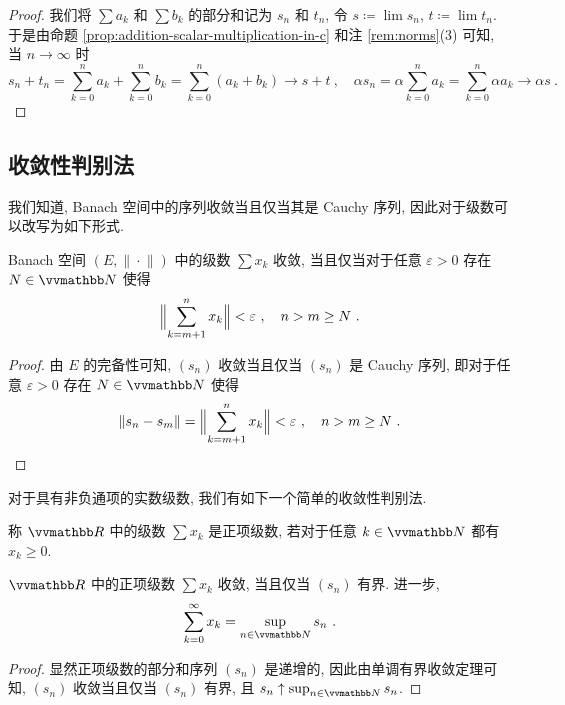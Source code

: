 \begin{proof}
    我们将 \(\sum a_k\) 和 \(\sum b_k\) 的部分和记为 \(s_n\) 和 \(t_n\), 令 \(s \coloneqq \lim s_n\), \(t \coloneqq \lim t_n\). 于是由命题 \ref{prop:addition-scalar-multiplication-in-c} 和注 \ref{rem:norms}(3) 可知, 当 \(n \to \infty\) 时
    \[
        s_n + t_n = \sum_{k = 0}^n a_k + \sum_{k = 0}^n b_k = \sum_{k = 0}^n (a_k + b_k) \to s + t\ ,\quad \alpha s_n = \alpha \sum_{k = 0}^n a_k = \sum_{k = 0}^n \alpha a_k \to \alpha s\ .
    \]
\end{proof}

\subsection{收敛性判别法}

我们知道, Banach 空间中的序列收敛当且仅当其是 Cauchy 序列, 因此对于级数可以改写为如下形式.

\begin{theorem}[Cauchy 准则]
    Banach 空间 \((E, \|\!\cdot\!\|)\) 中的级数 \(\sum x_k\) 收敛, 当且仅当对于任意 \(\varepsilon > 0\) 存在 \(N \in \N\) 使得
    \[
        \Bigl\|\sum_{k = m + 1}^n x_k\Bigr\| < \varepsilon\ ,\quad n > m \geq N\ .
    \]
\end{theorem}

\begin{proof}
    由 \(E\) 的完备性可知, \((s_n)\) 收敛当且仅当 \((s_n)\) 是 Cauchy 序列, 即对于任意 \(\varepsilon > 0\) 存在 \(N \in \N\) 使得
    \[
        \|s_n - s_m\| = \Bigl\|\sum_{k = m + 1}^n x_k\Bigr\| < \varepsilon\ ,\quad n > m \geq N\ .
    \]
\end{proof}

对于具有非负通项的实数级数, 我们有如下一个简单的收敛性判别法.

\begin{definition}[正项级数]
    称 \(\R\) 中的级数 \(\sum x_k\) 是正项级数, 若对于任意 \(k \in \N\) 都有 \(x_k \geq 0\).
\end{definition}

\begin{theorem}\label{thm:nonnegative-series-convergence-criterion}
    \(\R\) 中的正项级数 \(\sum x_k\) 收敛, 当且仅当 \((s_n)\) 有界. 进一步,
    \[
        \sum_{k = 0}^\infty x_k = \sup_{n \in \N} s_n\ .
    \]
\end{theorem}

\begin{proof}
    显然正项级数的部分和序列 \((s_n)\) 是递增的, 因此由单调有界收敛定理可知, \((s_n)\) 收敛当且仅当 \((s_n)\) 有界, 且 \(s_n \uparrow \sup_{n \in \N} s_n\).
\end{proof}

